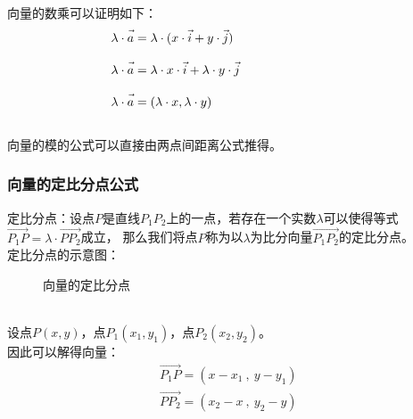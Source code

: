 \documentclass[UTF8]{ctexart}
\let\nvec\vec
\def\vec#1{\nvec{\vphantom b\smash{#1}}}
\begin{document}
    向量的数乘可以证明如下：
    \begin{align}
        &\lambda\cdot\vec{a}=\lambda\cdot(x\cdot\vec{i}+y\cdot\vec{j})\\[3mm]
        &\lambda\cdot\vec{a}=\lambda\cdot x\cdot\vec{i}+\lambda\cdot y\cdot\vec{j}~~~~~~~~~~~~~~~~~~~~~~~~~~~\\[3mm]
        &\lambda\cdot\vec{a}=(\lambda\cdot x,\lambda\cdot y)
    \end{align}\\
    向量的模的公式可以直接由两点间距离公式推得。

\newpage

\subsubsection{向量的定比分点公式}
    定比分点：设点$P$是直线$P_1P_2$上的一点，若存在一个实数$\lambda$可以使得等式$\overrightarrow{P_1P}=\lambda\cdot\overrightarrow{PP_2}$成立，
    那么我们将点$P$称为以$\lambda$为比分向量$\overrightarrow{P_1P_2}$的定比分点。\\[5mm]
    定比分点的示意图：
    \begin{figure}[h]
        \begin{center}
            \caption{向量的定比分点}
        \end{center}
    \end{figure}\\
    设点$P(x,y)$，点$P_1(x_1,y_1)$，点$P_2(x_2,y_2)$。\\[3mm]
    因此可以解得向量：
    \setcounter{equation}{0}
    \begin{align}
        &\overrightarrow{P_1P}=(x-x_1~,~y-y_1)~~~~~~\\[3mm]
        &\overrightarrow{PP_2}=(x_2-x~,~y_2-y)
    \end{align}\\
\end{document}
